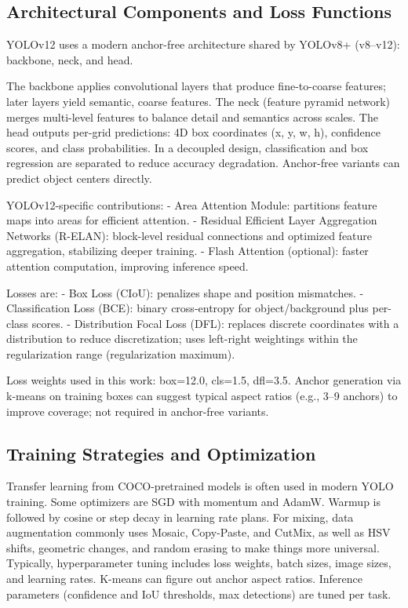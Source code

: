 \documentclass[conference]{IEEEtran}
\begin{document}
\subsection{Architectural Components and Loss Functions}

YOLOv12 uses a modern anchor-free architecture shared by YOLOv8+ (v8–v12): backbone, neck, and head.

The backbone applies convolutional layers that produce fine-to-coarse features; later layers yield semantic, coarse features. The neck (feature pyramid network) merges multi-level features to balance detail and semantics across scales. The head outputs per-grid predictions: 4D box coordinates (x, y, w, h), confidence scores, and class probabilities. In a decoupled design, classification and box regression are separated to reduce accuracy degradation. Anchor-free variants can predict object centers directly.

YOLOv12-specific contributions:
- Area Attention Module: partitions feature maps into areas for efficient attention.
- Residual Efficient Layer Aggregation Networks (R-ELAN): block-level residual connections and optimized feature aggregation, stabilizing deeper training.
- Flash Attention (optional): faster attention computation, improving inference speed.

Losses are:
- Box Loss (CIoU): penalizes shape and position mismatches.
- Classification Loss (BCE): binary cross-entropy for object/background plus per-class scores.
- Distribution Focal Loss (DFL): replaces discrete coordinates with a distribution to reduce discretization; uses left-right weightings within the regularization range (regularization maximum).

Loss weights used in this work: box=12.0, cls=1.5, dfl=3.5. Anchor generation via k-means on training boxes can suggest typical aspect ratios (e.g., 3--9 anchors) to improve coverage; not required in anchor-free variants.

\subsection{Training Strategies and Optimization}

Transfer learning from COCO-pretrained models is often used in modern YOLO training. Some optimizers are SGD with momentum and AdamW. Warmup is followed by cosine or step decay in learning rate plans. For mixing, data augmentation commonly uses Mosaic, Copy-Paste, and CutMix, as well as HSV shifts, geometric changes, and random erasing to make things more universal. Typically, hyperparameter tuning includes loss weights, batch sizes, image sizes, and learning rates. K-means can figure out anchor aspect ratios. Inference parameters (confidence and IoU thresholds, max detections) are tuned per task.
\end{document}
